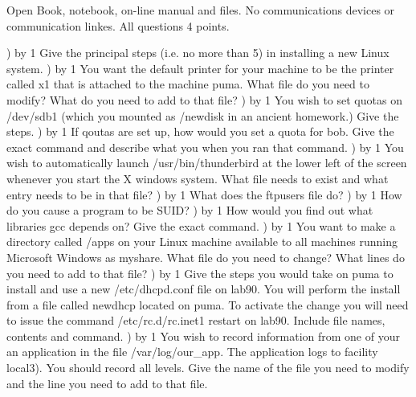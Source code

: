 
\parindent=0in
\nopagenumbers
\newcount\quesno
{}
\def\ques{\number\quesno) \advance\quesno by 1}
\def\aspace{\vskip 1.5in}

Open Book, notebook, on-line manual and files.
No communications devices or communication linkes.
All questions 4 points.

\ques
Give the principal steps (i.e. no more than 5)
in installing a new Linux system.
\vskip 1.8in
\ques
You want the default printer for your machine to be the printer
called {\ltt{}x1} that is attached to the machine {\ltt{}puma}.
What file do you need to modify?
What do you need to add to that file?
\vskip 1.0in
\ques
You wish to set quotas on {\ltt{}/dev/sdb1} (which you mounted
as {\ltt{}/newdisk} in an ancient homework.)
Give the steps.
\vskip 2.3in
\ques
If qoutas are set up, how would you set a quota for {\ltt{}bob}.
Give the exact command and describe what you when you ran that command.
\vskip 1.8in
\vfill\eject
\ques
You wish to automatically launch {\ltt{}/usr/bin/thunderbird} at the lower left
of the screen whenever you start the X windows system.
What file needs to exist and what entry needs to be in that file?
\vskip 1.0in
\ques
What does the {\ltt{}ftpusers} file do?
\vskip 0.7in
\ques
How do you cause a program to be SUID?
\vskip 1.6in
\ques
How would you find out what libraries gcc depends on?
Give the exact command.
\vskip 0.8in
\ques
You want to make a directory called {\ltt{}/apps} on your
Linux machine available to all machines running Microsoft Windows as
{\ltt{}myshare}.
What file do you need to change?
What lines do you need to add to that file?
\vskip 1.2in
\vfill\eject
\ques
Give the steps you would take on {\ltt{}puma} to install and use
a new {\ltt{}/etc/dhcpd.conf} file on {\ltt{}lab90}.
You will perform the install from a file called {\ltt{}newdhcp}
located on {\ltt{}puma}.
To activate the change you will need to issue the command
{\ltt{}/etc/rc.d/rc.inet1 restart} on {\ltt{}lab90}.
Include file names, contents and command.
\vskip 2.6in
\ques
You wish to record information
from one of your an application
in the file {\ltt{}/var/log/our_app}.
The application logs to facility {\ltt{}local3}).
You should record all levels.
Give the name of the file you need to modify and the line you need to
add to that file.
\vskip 1.4in
